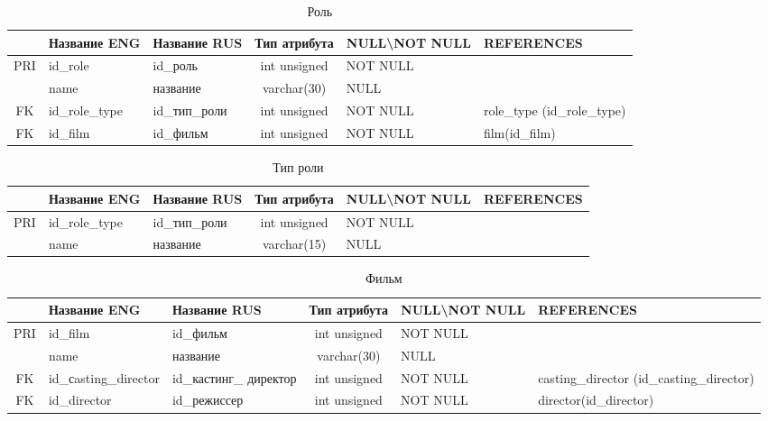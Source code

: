 \documentclass[11pt,a4paper,final]{article} %
\begin{document}
\vspace{-\baselineskip}
	
\begin{table}[H]
	\centering
	\begin{tabular}{|c|p{2.8cm}|p{2.5cm}|c|p{2cm}|p{3.5cm}|}
		\hline
		& Название ENG & Название RUS & Тип атрибута & NULL\textbackslash \newline NOT NULL & REFERENCES \\
		\hline
		PRI & id\_role & id\_роль  & int unsigned & NOT NULL &  \\
		\hline
		& name & название & varchar(30) & NULL & \\
		\hline
		FK & id\_role\_type & id\_тип\_роли & int unsigned & NOT NULL & role\_type \newline (id\_role\_type) \\
		\hline
		FK & id\_film & id\_фильм & int unsigned & NOT NULL & film(id\_film) \\
		\hline
	\end{tabular}
	\caption{Роль}
	\label{tab:role}
\end{table}
	

\begin{table}[H]
	\centering
	\begin{tabular}{|c|p{2.8cm}|p{2.5cm}|c|p{2cm}|p{3.5cm}|}
		\hline
		& Название ENG & Название RUS & Тип атрибута & NULL\textbackslash \newline NOT NULL & REFERENCES \\
		\hline
		PRI & id\_role\_type & id\_тип\_роли & int unsigned & NOT NULL &  \\
		\hline
		& name & название & varchar(15) & NULL & \\
		\hline
	\end{tabular}
	\caption{Тип роли}
	\label{tab:roletype}
\end{table}
	
\begin{table}[H]
	\centering
	\begin{tabular}{|c|p{2.8cm}|p{2.5cm}|c|p{2cm}|p{3.5cm}|}
		\hline
		& Название ENG & Название RUS & Тип атрибута & NULL\textbackslash \newline NOT NULL & REFERENCES \\
		\hline
		PRI & id\_film & id\_фильм  & int unsigned & NOT NULL &  \\
		\hline
		& name & название & varchar(30) & NULL & \\
		\hline
		FK & id\_сasting\_\newline director & id\_кастинг\_ \newline директор  & int unsigned & NOT NULL & casting\_director (id\_casting\_director) \\
        \hline
        FK & id\_director & id\_режиссер & int unsigned & NOT NULL & director(id\_director) \\
        \hline
	\end{tabular}
	\caption{Фильм}
	\label{tab:film}
\end{table}		
	
\end{document}
